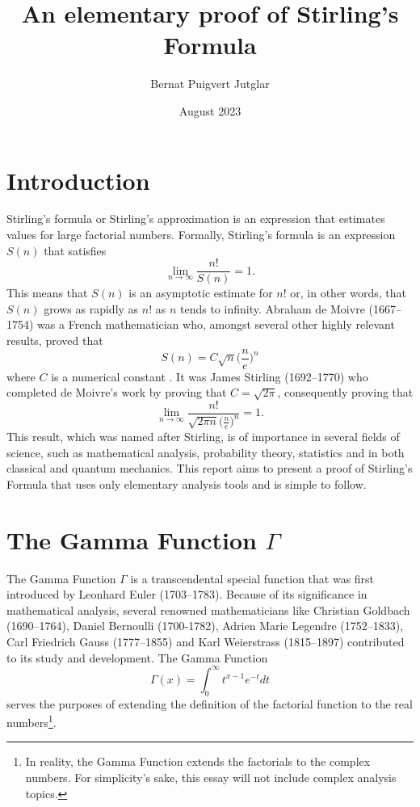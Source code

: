 \documentclass[12pt]{article}
\title{\textbf{An elementary proof of \hspace{50mm}Stirling's Formula}}
\author{Bernat Puigvert Jutglar }
\date{August 2023}
\begin{document}
\maketitle

\section{Introduction}

\noindent Stirling's formula or Stirling's approximation is an expression that estimates values for large factorial numbers. Formally, Stirling's formula is an expression $S(n)$ that satisfies $$\lim_{n\to\infty}\frac{n!}{S(n)}=1.$$ This means that $S(n)$ is an asymptotic estimate for $n!$ or, in other words, that $S(n)$ grows as rapidly as $n!$ as $n$ tends to infinity. Abraham de Moivre (1667--1754) was a French mathematician who, amongst several other highly relevant results, proved that $$S(n)=C\sqrt{n}\bigg(\frac{n}{e}\bigg)^n$$ where $C$ is a numerical constant \cite{r3}. It was James Stirling (1692--1770) who completed de Moivre's work by proving that $C=\sqrt{2\pi}$, consequently proving that $$\lim_{n\to\infty}\frac{n!}{\sqrt{2\pi n}\big(\frac{n}{e}\big)^n}=1.$$ This result, which was named after Stirling, is of importance in several fields of science, such as mathematical analysis, probability theory, statistics and in both classical and quantum mechanics. This report aims to present a proof of Stirling's Formula that uses only elementary analysis tools and is simple to follow.

\section{The Gamma Function $\Gamma$}
The Gamma Function $\Gamma$ is a transcendental special function that was first introduced by Leonhard Euler (1703--1783). Because of its significance in mathematical analysis, several renowned mathematicians like Christian Goldbach (1690--1764),  Daniel Bernoulli (1700-1782), Adrien Marie Legendre (1752--1833), Carl Friedrich Gauss (1777--1855) and Karl Weierstrass (1815--1897) contributed to its study and development. The Gamma Function $$\Gamma(x)=\int_0^\infty t^{x-1}e^{-t}dt$$ serves the purposes of extending the definition of the factorial function to the real numbers\footnote{In reality, the Gamma Function extends the factorials to the complex numbers. For simplicity's sake, this essay will not include complex analysis topics.}.

\vspace{3mm}
\end{document}
